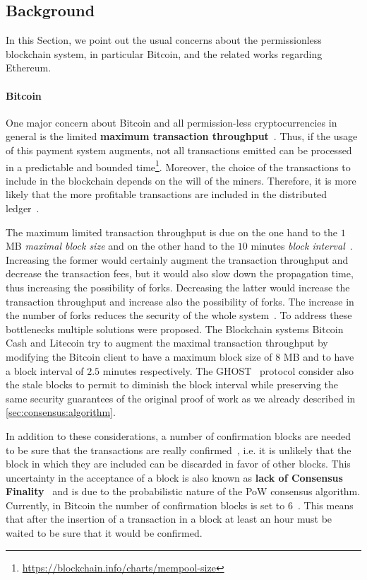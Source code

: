 \subsection{Background}
\label{sec:background}

In this Section, we point out the usual concerns about the permissionless
blockchain system, in particular Bitcoin, and the related works regarding
Ethereum.

\paragraph{Bitcoin}
One major concern about Bitcoin and all permission-less cryptocurrencies in
general is the limited \textbf{maximum transaction
throughput}~\cite{bib:blockchain-challenges-opportunites-survey, bib:taxonomy,
bib:scaling-croman}. Thus, if the usage of this payment system augments, not all
transactions emitted can be processed in a predictable and bounded
time\footnote{\url{https://blockchain.info/charts/mempool-size}}. Moreover, the
choice of the transactions to include in the blockchain depends on the will of
the miners. Therefore, it is more likely that the more profitable transactions
are included in the distributed
ledger~\cite{bib:blockchain-challenges-opportunites-survey,wood2018ethereum}.

The maximum limited transaction throughput is due on the one hand to the $1$ MB
\emph{maximal block size} and on the other hand to the $10$ minutes \emph{block
interval}~\cite{bib:ghost, bib:scaling-croman}. Increasing the former would
certainly augment the transaction throughput and decrease the transaction fees,
but it would also slow down the propagation time, thus increasing the
possibility of forks. Decreasing the latter would increase the transaction
throughput and increase also the possibility of forks. The increase in the
number of forks reduces the security of the whole system~\cite{bib:ghost}. To
address these bottlenecks multiple solutions were proposed. The Blockchain
systems Bitcoin Cash and Litecoin try to augment the maximal transaction
throughput by modifying the Bitcoin client to have a maximum block size of $8$
MB and to have a block interval of $2.5$ minutes respectively. The
GHOST~\cite{bib:ghost} protocol consider also the stale blocks to permit to
diminish the block interval while preserving the same security guarantees of the
original proof of work as we already described in
\autoref{sec:consensus:algorithm}.

In addition to these considerations, a number of confirmation blocks are needed
to be sure that the transactions are really confirmed~\cite{bib:taxonomy}, i.e.
it is unlikely that the block in which they are included can be discarded in
favor of other blocks. This uncertainty in the acceptance of a block is also
known as \textbf{lack of Consensus Finality}~\cite{bib:the-quest} and is due to
the probabilistic nature of the PoW consensus algorithm. Currently, in Bitcoin
the number of confirmation blocks is set to $6$~\cite{bib:masteringbitcoin}.
This means that after the insertion of a transaction in a block at least an hour
must be waited to be sure that it would be confirmed.

